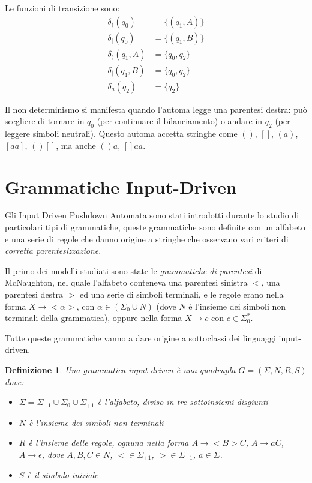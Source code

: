 \documentclass[a4paper,12pt]{report}
\newtheorem{definition}{Definizione}[chapter]
\theoremstyle{propositionstyle}
\begin{document}
    Le funzioni di transizione sono:
    \begin{align}
        \delta_{(}(q_0) &= \{(q_1, A)\} \\
        \delta_{[}(q_0) &= \{(q_1, B)\} \\
        \delta_{)}(q_1, A) &= \{q_0, q_2\} \\
        \delta_{]}(q_1, B) &= \{q_0, q_2\} \\
        \delta_{a}(q_2) &= \{q_2\}
    \end{align}
    
    Il non determinismo si manifesta quando l'automa legge una parentesi destra: può scegliere di tornare in $q_0$ (per continuare il bilanciamento) o andare in $q_2$ (per leggere simboli neutrali).
    Questo automa accetta stringhe come $()$, $[]$, $(a)$, $[aa]$, $()[]$, ma anche $()a$, $[]aa$.

    \section{Grammatiche Input-Driven}

    Gli Input Driven Pushdown Automata sono stati introdotti durante lo studio di particolari tipi di grammatiche, queste grammatiche sono definite
    con un alfabeto e una serie di regole che danno origine a stringhe che osservano vari criteri di \textit{corretta parentesizzazione}.
    
    Il primo dei modelli studiati sono state le \textit{grammatiche di parentesi} di McNaughton, nel quale l'alfabeto conteneva una parentesi sinistra $<$, una parentesi destra $>$
    ed una serie di simboli terminali, e le regole erano nella forma $X \rightarrow <\alpha>$, con $\alpha \in \left(\Sigma_0 \cup N\right)$ (dove $N$ è l'insieme dei simboli non terminali della grammatica), oppure nella forma $X \rightarrow c$ con $c \in \Sigma_0^*$.
    
    Tutte queste grammatiche vanno a dare origine a sottoclassi dei linguaggi input-driven.

    \begin{definition}
        Una grammatica input-driven è una quadrupla $G = \left(\Sigma, N, R, S\right)$ dove:
        \begin{itemize}
            \item $\Sigma = \Sigma_{-1} \cup \Sigma_0 \cup \Sigma_{+1}$ è l'alfabeto, diviso in tre sottoinsiemi disgiunti
            \item $N$ è l'insieme dei simboli non terminali
            \item $R$ è l'insieme delle regole, ognuna nella forma $A \rightarrow <B>C$, $A \rightarrow aC$, $A \rightarrow \epsilon$, dove $A, B, C \in N$, $< \in \Sigma_{+1}$, $> \in \Sigma_{-1}$, $a \in \Sigma$.
            \item $S$ è il simbolo iniziale
        \end{itemize}
    \end{definition}
\end{document}
